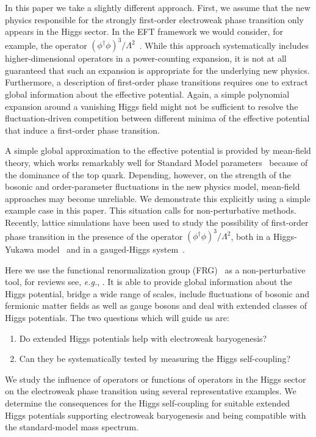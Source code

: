 \documentclass[aps,prd,11pt,tightenlines,superscriptaddress,nofootinbib,preprintnumbers,notitlepage]{revtex4-1}
\newcommand{\eg}{\textsl{e.g.}\;}
\begin{document}
In this paper we take a slightly different approach. First, we assume
that the new physics responsible for the strongly first-order
electroweak phase transition only appears in the Higgs sector. In the
EFT framework we would consider, for example, the operator $(\phi^\dag
\phi)^3/\Lambda^2$~\cite{christophe_geraldine,eft2,Noble}.  While this approach
systematically includes higher-dimensional operators in a
power-counting expansion, it is not at all guaranteed that such an
expansion is appropriate for the underlying new physics. Furthermore,
a description of first-order phase transitions requires one to extract
global information about the effective potential. Again, a simple
polynomial expansion around a vanishing Higgs field 
might not be sufficient to resolve the fluctuation-driven competition
between different minima of the effective potential that induce a
first-order phase transition.

A simple global approximation to the effective potential is provided
by mean-field theory, which works remarkably well for Standard Model
parameters~\cite{mean-field,Gies:2013fua,Borchardt:2016xju,Sondenheimer:2017jin}
because of the dominance of the top quark. Depending, however, on the
strength of the bosonic and order-parameter fluctuations in the new
physics model, mean-field approaches may become unreliable.  We demonstrate this explicitly
using a simple example case in this paper.  This
situation calls for non-perturbative methods. Recently, lattice
simulations have been used to study the possibility of first-order
phase transition in the presence of the operator 
$(\phi^\dag\phi)^3/\Lambda^2$, both in a Higgs-Yukawa
model~\cite{Akerlund:2015fya} and in a gauged-Higgs
system~\cite{Akerlund:2015gfy}.

Here we use the functional renormalization group
(FRG)~\cite{christof_eq} as a non-perturbative tool, for reviews see,
\eg, \cite{rg_reviews}. It is able to provide global information
about the Higgs potential, bridge a wide range of scales, include
fluctuations of bosonic and fermionic matter fields as well as gauge
bosons and deal with extended classes of Higgs potentials. The two
questions which will guide us are:
%
\begin{enumerate}
\setlength{\itemsep}{0mm}
\item Do extended Higgs potentials help with electroweak baryogenesis?
\item Can they be systematically tested by measuring the Higgs self-coupling?
\end{enumerate}
%
We study the influence of operators or functions of operators in the
Higgs sector on the electroweak phase transition using several
representative examples. We determine the consequences for
the Higgs self-coupling for suitable extended Higgs potentials
supporting electroweak baryogenesis and being compatible with the
standard-model mass spectrum.\medskip
\end{document}
